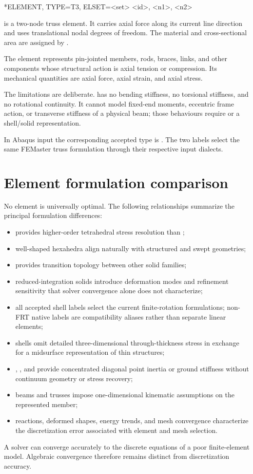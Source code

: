 \begin{syntax}
*ELEMENT, TYPE=T3, ELSET=<set>
<id>, <n1>, <n2>
\end{syntax}

 is a two-node truss element. It carries axial force along its current line direction and uses translational nodal degrees of freedom. The material and cross-sectional area are assigned by .

The element represents pin-jointed members, rods, braces, links, and other components whose structural action is axial tension or compression. Its mechanical quantities are axial force, axial strain, and axial stress.

The limitations are deliberate.  has no bending stiffness, no torsional stiffness, and no rotational continuity. It cannot model fixed-end moments, eccentric frame action, or transverse stiffness of a physical beam; those behaviours require  or a shell/solid representation.

In Abaqus input the corresponding accepted type is . The two labels select the same FEMaster truss formulation through their respective input dialects.

\section{Element formulation comparison}

No element is universally optimal. The following relationships summarize the principal formulation differences:
\begin{itemize}
  \item {} provides higher-order tetrahedral stress resolution than ;
  \item well-shaped hexahedra align naturally with structured and swept geometries;
  \item {} provides transition topology between other solid families;
  \item reduced-integration solids introduce deformation modes and refinement sensitivity that solver convergence alone does not characterize;
  \item all accepted shell labels select the current finite-rotation formulations; non-FRT native labels are compatibility aliases rather than separate linear elements;
  \item shells omit detailed three-dimensional through-thickness stress in exchange for a midsurface representation of thin structures;
  \item {}, , and  provide concentrated diagonal point inertia or ground stiffness without continuum geometry or stress recovery;
  \item beams and trusses impose one-dimensional kinematic assumptions on the represented member;
  \item reactions, deformed shapes, energy trends, and mesh convergence characterize the discretization error associated with element and mesh selection.
\end{itemize}

A solver can converge accurately to the discrete equations of a poor finite-element model. Algebraic convergence therefore remains distinct from discretization accuracy.
